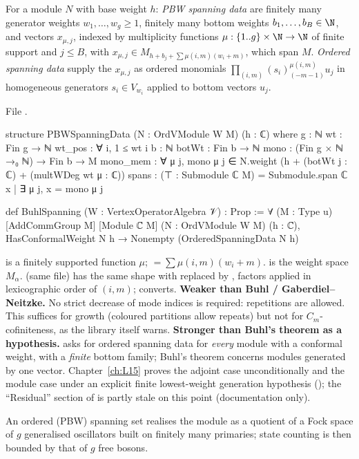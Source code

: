 \begin{definition}\label{l14:def:pbw}
For a module $N$ with base weight $h$: \emph{PBW spanning data} are finitely many generator weights $w_1,\dots,w_g\ge1$,
finitely many bottom weights $b_1,\dots,b_B\in\N$, and vectors $x_{\mu,j}$, indexed by multiplicity functions
$\mu:\{1..g\}\times\N\to\N$ of finite support and $j\le B$, with $x_{\mu,j}\in M_{h + b_j + \sum\mu(i,m)(w_i+m)}$, which span
$M$. \emph{Ordered spanning data} supply the $x_{\mu,j}$ as ordered monomials
$\prod_{(i,m)}(s_i)_{(-m-1)}^{\mu(i,m)}u_j$ in homogeneous generators $s_i\in V_{w_i}$ applied to bottom vectors $u_j$.
\end{definition}
\noindent File .
\begin{leancode}
structure PBWSpanningData (N : OrdVModule W M) (h : ℂ) where
  g : ℕ
  wt : Fin g → ℕ
  wt_pos : ∀ i, 1 ≤ wt i
  b : ℕ
  botWt : Fin b → ℕ
  mono : (Fin g × ℕ →₀ ℕ) → Fin b → M
  mono_mem : ∀ μ j, mono μ j ∈ N.weight (h + (botWt j : ℂ) + (multWDeg wt μ : ℂ))
  spans : (⊤ : Submodule ℂ M) = Submodule.span ℂ {x | ∃ μ j, x = mono μ j}

def BuhlSpanning (W : VertexOperatorAlgebra 𝒱) : Prop :=
  ∀ (M : Type u) [AddCommGroup M] [Module ℂ M] (N : OrdVModule W M) (h : ℂ),
    HasConformalWeight N h → Nonempty (OrderedSpanningData N h)
\end{leancode}
\begin{dictionary}
 is a finitely supported function $\mu$;  $=\sum\mu(i,m)(w_i+m)$. 
is the weight space $M_\alpha$.  (same file) has the same shape with  replaced by
, factors applied in lexicographic order of $(i,m)$; 
converts. \textbf{Weaker than Buhl / Gaberdiel--Neitzke.} No strict decrease of mode indices is required: repetitions are
allowed. This suffices for growth (coloured partitions allow repeats) but not for $C_m$-cofiniteness, as the library itself
warns. \textbf{Stronger than Buhl's theorem as a hypothesis.}  asks for ordered spanning data for
\emph{every} module with a conformal weight, with a \emph{finite} bottom family; Buhl's theorem concerns modules generated by
one vector. Chapter~\ref{ch:L15} proves the adjoint case unconditionally and the module case under an explicit finite
lowest-weight generation hypothesis (); the ``Residual'' section of
 is partly stale on this point (documentation only).
\end{dictionary}
\begin{physics}
An ordered (PBW) spanning set realises the module as a quotient of a Fock space of $g$ generalised oscillators built on finitely
many primaries; state counting is then bounded by that of $g$ free bosons.
\end{physics}

